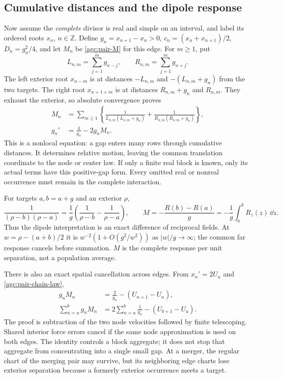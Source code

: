 \subsection{Cumulative distances and the dipole response}

Now assume the \emph{complete} divisor is real and simple on an interval,
and label its ordered roots $x_n$, $n\in\mathbb Z$. Define
$g_n=x_{n+1}-x_n>0$, $c_n=(x_n+x_{n+1})/2$,
$D_n=g_n^2/4$, and let $M_n$ be \eqref{agc:pair-M} for this edge.
For $m\ge1$, put
\[
 L_{n,m}=\sum_{j=1}^m g_{n-j},\qquad
 R_{n,m}=\sum_{j=1}^m g_{n+j}.
\]
The left exterior root $x_{n-m}$ is at distances $-L_{n,m}$ and
$-(L_{n,m}+g_n)$ from the two targets. The right root
$x_{n+1+m}$ is at distances $R_{n,m}+g_n$ and $R_{n,m}$.
They exhaust the exterior, so absolute convergence proves
\begin{equation}
 \begin{split}
 M_n&=\sum_{m\ge1}\left\{
 \frac1{L_{n,m}(L_{n,m}+g_n)}+
 \frac1{R_{n,m}(R_{n,m}+g_n)}\right\},\\
 g_n'&=\frac4{g_n}-2g_nM_n.
 \end{split}
 \label{agc:pair-chain-law}
\end{equation}
This is a nonlocal equation: a gap enters many rows through cumulative
distances. It determines relative motion, leaving the common translation
coordinate to the node or center law. If only a finite real block is
known, only its actual terms have this positive-gap form. Every omitted
real or nonreal occurrence must remain in the complete interaction.

For targets $a,b=a+g$ and an exterior $\rho$,
\begin{equation}
 \frac1{(\rho-b)(\rho-a)}
   =\frac1g\left(\frac1{\rho-b}-\frac1{\rho-a}\right),\qquad
 M=-\frac{R(b)-R(a)}g=-\frac1g\int_a^b R_z(z)\,\dd z.
 \label{agc:pair-dipole}
\end{equation}
Thus the dipole interpretation is an exact difference of reciprocal
fields. At $w=\rho-(a+b)/2$ it is
$w^{-2}(1+O(g^2/w^2))$ as $|w|/g\to\infty$; the common far
response cancels before summation. $M$ is the complete response per
unit separation, not a population average.

There is also an exact spatial cancellation across edges. From
$x_n'=2U_n$ and \eqref{agc:pair-chain-law},
\begin{equation}
 \begin{split}
 g_nM_n&=\frac2{g_n}-(U_{n+1}-U_n),\\
 \sum_{n=a}^{b}g_nM_n
   &=2\sum_{n=a}^{b}\frac1{g_n}-(U_{b+1}-U_a).
 \end{split}
 \label{agc:pair-block}
\end{equation}
The proof is subtraction of the two node velocities followed by finite
telescoping. Shared interior force errors cancel if the same node
approximation is used on both edges. The identity controls a block
aggregate; it does not stop that aggregate from concentrating into a
single small gap. At a merger, the regular chart of the merging pair
may survive, but its neighboring edge charts lose exterior separation
because a formerly exterior occurrence meets a target.

